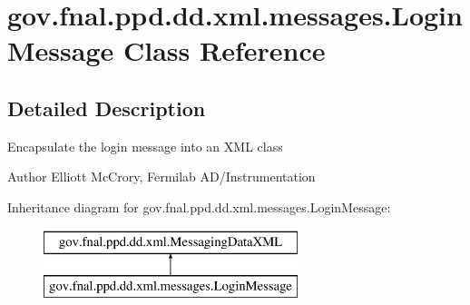 \hypertarget{classgov_1_1fnal_1_1ppd_1_1dd_1_1xml_1_1messages_1_1LoginMessage}{\section{gov.\-fnal.\-ppd.\-dd.\-xml.\-messages.\-Login\-Message Class Reference}
\label{classgov_1_1fnal_1_1ppd_1_1dd_1_1xml_1_1messages_1_1LoginMessage}
}


\subsection{Detailed Description}
Encapsulate the login message into an X\-M\-L class

\begin{DoxyAuthor}{Author}
Elliott Mc\-Crory, Fermilab A\-D/\-Instrumentation 
\end{DoxyAuthor}
Inheritance diagram for gov.\-fnal.\-ppd.\-dd.\-xml.\-messages.\-Login\-Message\-:\begin{figure}[H]
\begin{center}
\leavevmode
\includegraphics[height=2.000000cm]{classgov_1_1fnal_1_1ppd_1_1dd_1_1xml_1_1messages_1_1LoginMessage}
\end{center}
\end{figure}

